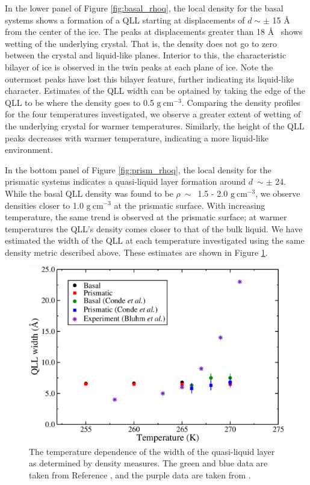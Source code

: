 In the lower panel of Figure \ref{fig:basal_rhoq}, the local density
for the basal systems shows a formation of a QLL starting at
displacements of $d\sim\pm$ 15 \AA~ from the center of the ice. The
peaks at displacements greater than 18 \AA~ shows wetting of the
underlying crystal. That is, the density does not go to zero between
the crystal and liquid-like planes. Interior to this, the
characteristic bilayer of ice is observed in the twin peaks at each
plane of ice. Note the outermost peaks have lost this bilayer
feature, further indicating its liquid-like character. Estimates of
the QLL width can be optained by taking the edge of the QLL to be
where the density goes to 0.5 $\mathrm{g}~\mathrm{cm}^{-3}$. Comparing
the density profiles for the four temperatures investigated, we
observe a greater extent of wetting of the underlying crystal for
warmer temperatures. Similarly, the height of the QLL peaks decreases
with warmer temperature, indicating a more liquid-like environment.

In the bottom panel of Figure \ref{fig:prism_rhoq}, the local density
for the prismatic systems indicates a quasi-liquid layer formation
around $d~\sim\pm$ 24. While the basal QLL density was found to be
$\rho~ \sim$~1.5 - 2.0 $\mathrm{g}~\mathrm{cm}^{-3}$, we observe
densities closer to 1.0 $\mathrm{g}~\mathrm{cm}^{-3}$ at the prismatic
surface. With increasing temperature, the same trend is observed at the
prismatic surface; at warmer temperatures the QLL's density comes
closer to that of the bulk liquid. We have estimated the width of the
QLL at each temperature investigated using the same density metric
described above. These estimates are shown in Figure
\ref{fig:qllWidth}.  

\begin{figure}
\includegraphics[width=\linewidth]{Figures/qllWidthT}
\caption{\label{fig:qllWidth} The temperature dependence of the width
  of the quasi-liquid layer as determined by density measures. The
  green and blue data are taken from Reference \cite{Conde2008}, and
  the purple data are taken from \cite{Bluhm2002}. }
\end{figure}           

